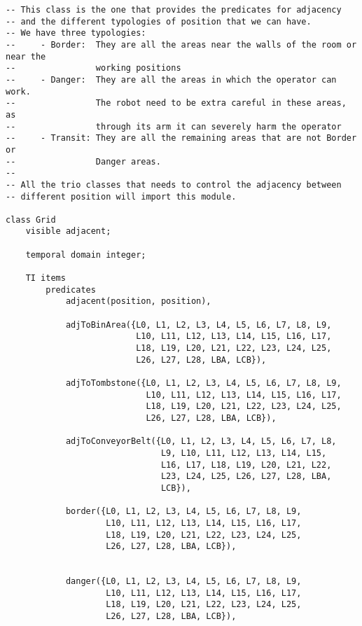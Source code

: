 \begin{lstlisting}[fontadjust, mathescape, frame=single] 
-- This class is the one that provides the predicates for adjacency
-- and the different typologies of position that we can have.
-- We have three typologies:
--     - Border:  They are all the areas near the walls of the room or near the
--                working positions
--     - Danger:  They are all the areas in which the operator can work. 
--                The robot need to be extra careful in these areas, as
--                through its arm it can severely harm the operator
--     - Transit: They are all the remaining areas that are not Border or
--                Danger areas.
-- 
-- All the trio classes that needs to control the adjacency between 
-- different position will import this module.

class Grid
    visible adjacent;

    temporal domain integer;

    TI items
        predicates 
            adjacent(position, position),
                    
            adjToBinArea({L0, L1, L2, L3, L4, L5, L6, L7, L8, L9,
                          L10, L11, L12, L13, L14, L15, L16, L17,
                          L18, L19, L20, L21, L22, L23, L24, L25,
                          L26, L27, L28, LBA, LCB}),
                          
            adjToTombstone({L0, L1, L2, L3, L4, L5, L6, L7, L8, L9,
                            L10, L11, L12, L13, L14, L15, L16, L17,
                            L18, L19, L20, L21, L22, L23, L24, L25,
                            L26, L27, L28, LBA, LCB}),
                            
            adjToConveyorBelt({L0, L1, L2, L3, L4, L5, L6, L7, L8,
                               L9, L10, L11, L12, L13, L14, L15, 
                               L16, L17, L18, L19, L20, L21, L22,
                               L23, L24, L25, L26, L27, L28, LBA,
                               LCB}),
                               
            border({L0, L1, L2, L3, L4, L5, L6, L7, L8, L9,
                    L10, L11, L12, L13, L14, L15, L16, L17,
                    L18, L19, L20, L21, L22, L23, L24, L25,
                    L26, L27, L28, LBA, LCB}),
             
                    
            danger({L0, L1, L2, L3, L4, L5, L6, L7, L8, L9,
                    L10, L11, L12, L13, L14, L15, L16, L17,
                    L18, L19, L20, L21, L22, L23, L24, L25,
                    L26, L27, L28, LBA, LCB}),
                    

\end{lstlisting}
